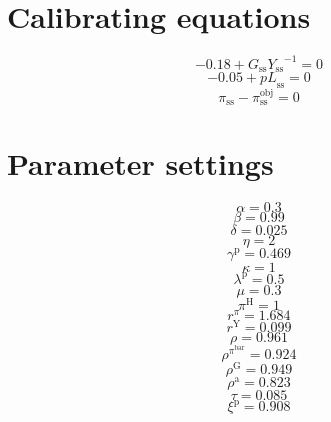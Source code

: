 \section{Calibrating equations}

\begin{equation}
-0.18 + {G_\mathrm{ss}} {Y_\mathrm{ss}}^{-1} = 0
\end{equation}
\begin{equation}
-0.05 + {p\!L}_\mathrm{ss} = 0
\end{equation}
\begin{equation}
\pi_\mathrm{ss} - \pi^{\mathrm{obj}}_\mathrm{ss} = 0
\end{equation}



\section{Parameter settings}

\begin{equation}
\alpha = 0.3
\end{equation}
\begin{equation}
\beta = 0.99
\end{equation}
\begin{equation}
\delta = 0.025
\end{equation}
\begin{equation}
\eta = 2
\end{equation}
\begin{equation}
\gamma^{\mathrm{p}} = 0.469
\end{equation}
\begin{equation}
\kappa = 1
\end{equation}
\begin{equation}
\lambda^{\mathrm{p}} = 0.5
\end{equation}
\begin{equation}
\mu = 0.3
\end{equation}
\begin{equation}
\pi^{\mathrm{H}} = 1
\end{equation}
\begin{equation}
r^{\pi} = 1.684
\end{equation}
\begin{equation}
r^{\mathrm{Y}} = 0.099
\end{equation}
\begin{equation}
\rho = 0.961
\end{equation}
\begin{equation}
\rho^{\pi^{\mathrm{bar}}} = 0.924
\end{equation}
\begin{equation}
\rho^{\mathrm{G}} = 0.949
\end{equation}
\begin{equation}
\rho^{\mathrm{a}} = 0.823
\end{equation}
\begin{equation}
\tau = 0.085
\end{equation}
\begin{equation}
\xi^{\mathrm{p}} = 0.908
\end{equation}


